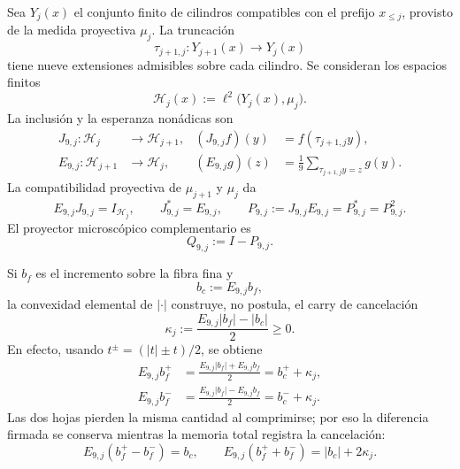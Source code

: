 Sea \(Y_j(x)\) el conjunto finito de cilindros compatibles con el prefijo
\(x_{\leq j}\), provisto de la medida proyectiva \(\mu_j\).  La truncación
\[
 \tau_{j+1,j}:Y_{j+1}(x)\longrightarrow Y_j(x)
\]
tiene nueve extensiones admisibles sobre cada cilindro.  Se consideran los
espacios finitos
\[
 \mathscr H_j(x):=\ell^2\bigl(Y_j(x),\mu_j\bigr).
\]
La inclusión y la esperanza nonádicas son
\begin{align}
 J_{9,j}:\mathscr H_j&\longrightarrow\mathscr H_{j+1},
 &(J_{9,j}f)(y)&=f(\tau_{j+1,j}y),
 \label{eq:pdfv2-sol-j9}\\
 E_{9,j}:\mathscr H_{j+1}&\longrightarrow\mathscr H_j,
 &(E_{9,j}g)(z)&=\frac1{9}
   \sum_{\tau_{j+1,j}y=z}g(y).
 \label{eq:pdfv2-sol-e9}
\end{align}
La compatibilidad proyectiva de \(\mu_{j+1}\) y \(\mu_j\) da
\begin{equation}\label{eq:pdfv2-sol-ej-projector}
 E_{9,j}J_{9,j}=I_{\mathscr H_j},
 \qquad
 J_{9,j}^*=E_{9,j},
 \qquad
 P_{9,j}:=J_{9,j}E_{9,j}=P_{9,j}^*=P_{9,j}^2.
\end{equation}
El proyector microscópico complementario es
\begin{equation}\label{eq:pdfv2-sol-qmicro-preliminar}
 Q_{9,j}:=I-P_{9,j}.
\end{equation}

Si \(b_f\) es el incremento sobre la fibra fina y
\begin{equation}\label{eq:pdfv2-sol-bcoarse}
 b_c:=E_{9,j}b_f,
\end{equation}
la convexidad elemental de \(|\cdot|\) construye, no postula, el carry de
cancelación
\begin{equation}\label{eq:pdfv2-sol-kappa}
 \kappa_j
 :=\frac{E_{9,j}|b_f|-|b_c|}{2}\geq0.
\end{equation}
En efecto, usando \(t^\pm=(|t|\pm t)/2\), se obtiene
\begin{align}
 E_{9,j}b_f^+
 &=\frac{E_{9,j}|b_f|+E_{9,j}b_f}{2}
   =b_c^++\kappa_j,
 \label{eq:pdfv2-sol-jensen-plus}\\
 E_{9,j}b_f^-
 &=\frac{E_{9,j}|b_f|-E_{9,j}b_f}{2}
   =b_c^-+\kappa_j.
 \label{eq:pdfv2-sol-jensen-minus}
\end{align}
Las dos hojas pierden la misma cantidad al comprimirse; por eso la diferencia
firmada se conserva mientras la memoria total registra la cancelación:
\begin{equation}\label{eq:pdfv2-sol-jensen-dh}
 E_{9,j}(b_f^+-b_f^-)=b_c,
 \qquad
 E_{9,j}(b_f^++b_f^-)=|b_c|+2\kappa_j.
\end{equation}

